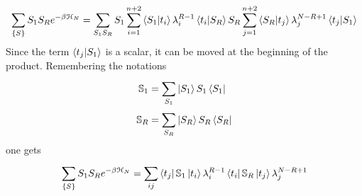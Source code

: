 \documentclass[../../Main/Main.tex]{subfiles}
\begin{document}
\begin{equation*}
  \sum_{\{ S \}  }^{}  S_1 S_R e^{-\beta \mathcal{H}_N} = \sum_{S_1 S_R}^{} S_1 \sum_{i=1}^{n+2} \braket{S_1}{t_i} \lambda _i^{R-1} \braket{t_i}{S_R} S_R \sum_{j=1}^{n+2} \braket{S_R}{t_j} \lambda_j ^{N-R+1} \braket{t_j}{S_1}
\end{equation*}
Since the term \( \braket{t_j}{S_1}  \) is a scalar, it can be moved at the beginning of the product. Remembering the notations
\begin{subequations}
\begin{align}
  \mathbb{S}_1 &= \sum_{S_1}^{} \ket{S_1} S_1 \bra{S_1} \\
  \mathbb{S}_R &= \sum_{S_R}^{} \ket{S_R} S_R \bra{S_R}
\end{align}
\end{subequations}
one gets
\begin{equation}
  \sum_{\{ S \}  }^{}  S_1 S_R e^{-\beta \mathcal{H}_N}= \sum_{ij}^{} \bra{t_j } \mathbb{S}_1 \ket{t_i} \lambda _i^{R-1} \bra{t_i} \mathbb{S}_R \ket{t_j} \lambda _j ^{N-R+1}
\end{equation}


\end{document}
